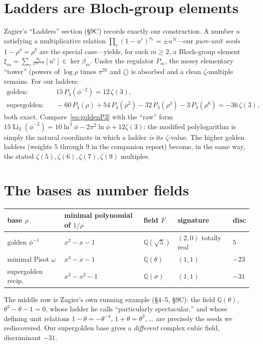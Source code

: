 \documentclass[11pt]{article}
\DeclareMathOperator{\Li}{Li}
\theoremstyle{plain}\newtheorem{theorem}{Theorem}\newtheorem{proposition}[theorem]{Proposition}
\theoremstyle{remark}\newtheorem{remark}[theorem]{Remark}
\begin{document}
\section{Ladders are Bloch-group elements}
Zagier's ``Ladders'' section (\S9C) records exactly our construction. A number $u$ satisfying a multiplicative
relation $\prod_r(1-u^r)^{a_r}=\pm u^N$---our \emph{pure-unit seeds} $1-\rho^a=\rho^b$ are the special case---yields,
for each $m\ge2$, a Bloch-group element $\xi_m=\sum_r\frac{a_r}{r^{m-1}}[u^r]\in\ker\beta_m$. Under the regulator
$P_m$, the messy elementary ``tower'' (powers of $\log\rho$ times $\pi^{2k}$ and $\zeta$) is absorbed and a clean
$\zeta$-multiple remains. For our ladders:
\begin{align}
  \text{golden}:&\quad 15\,P_3(\phi^{-2})=12\,\zeta(3),\label{eq:goldenP3}\\
  \text{supergolden}:&\quad -60\,P_3(\rho)+54\,P_3(\rho^2)-32\,P_3(\rho^3)-3\,P_3(\rho^6)=-36\,\zeta(3),
  \label{eq:sgP3}
\end{align}
both exact. Compare~\eqref{eq:goldenP3} with the ``raw'' form $15\Li_3(\phi^{-2})=10\ln^3\phi-2\pi^2\ln\phi+12\zeta(3)$:
the modified polylogarithm is simply the natural coordinate in which a ladder \emph{is} its $\zeta$-value. The
higher golden ladders (weights $5$ through $9$ in the companion report) become, in the same way, the stated
$\zeta(5),\zeta(6),\zeta(7),\zeta(9)$ multiples.

\section{The bases as number fields}
\begin{center}\small
\begin{tabular}{lllll}
\toprule
base $\rho$ & minimal polynomial of $1/\rho$ & field $F$ & signature & disc \\
\midrule
golden $\phi^{-1}$ & $x^2-x-1$ & $\mathbb Q(\sqrt5)$ & $(2,0)$ totally real & $5$ \\
minimal Pisot $\omega$ & $x^3-x-1$ & $\mathbb Q(\theta)$ & $(1,1)$ & $-23$ \\
supergolden recip.\ & $x^3-x^2-1$ & $\mathbb Q(\sigma)$ & $(1,1)$ & $-31$ \\
\bottomrule
\end{tabular}
\end{center}
The middle row is Zagier's own running example (\S4--5, \S9C): the field $\mathbb Q(\theta)$, $\theta^3-\theta-1=0$,
whose ladder he calls ``particularly spectacular,'' and whose defining unit relations
$1-\theta=-\theta^{-4},\,1+\theta=\theta^3,\dots$ are precisely the seeds we rediscovered. Our supergolden base
gives a \emph{different} complex cubic field, discriminant $-31$.
\end{document}

